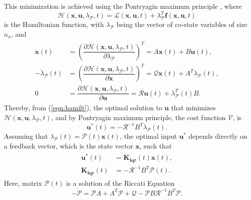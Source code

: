 This minimization is achieved using the Pontryagin maximum principle \cite{Murray2009}, where
\begin{equation}
\mathcal{H}(\mathbf{x},\mathbf{u},\lambda_\mathcal{P},t) = \mathcal{L}(\mathbf{x},\mathbf{u},t) + \lambda_\mathcal{P}^{T}\mathbf{f}(\mathbf{x}, \mathbf{u}, t)
\end{equation}
is the Hamiltonian function, with $\lambda_\mathcal{P}$ being the vector of co-state variables of size $\mathit{n_x}$, and
\begin{align}
\label{eqn:hamilt}
\begin{split}
\dot{\mathbf{x}}(t) & = \left(\dfrac{\partial \mathcal{H}(\mathbf{x},\mathbf{u},\lambda_\mathcal{P},t)}{\partial \lambda_\mathcal{P}}\right)^{T} = A\mathbf{x}(t)+B\mathbf{u}(t),\\[5px]
-\dot{\lambda}_{\mathcal{P}}(t) & = \left(\dfrac{\partial \mathcal{H}(\mathbf{x},\mathbf{u},\lambda_\mathcal{P},t)}{\partial \mathbf{x}}\right)^{T} = \mathcal{Q}\mathbf{x}(t) + A^{T}\lambda_{\mathcal{P}}(t),\\[5px]
0 & = \dfrac{\partial \mathcal{H}(\mathbf{x},\mathbf{u},\lambda_\mathcal{P},t)}{\partial \mathbf{u}} = \mathcal{R}\mathbf{u}(t) + \lambda_\mathcal{P}^{T}(t)B.
\end{split}
\end{align}
Thereby, from (\ref{eqn:hamilt}), the optimal solution to $\mathbf{u}$ that minimizes $\mathcal{H}(\mathbf{x},\mathbf{u},\lambda_\mathcal{P},t)$, and by Pontryagin maximum principle, the cost function $\mathcal{V}$, is
\begin{equation}
\mathbf{u}^{*}(t) = -\mathcal{R}^{-1}B^{T}\lambda_\mathcal{P}(t).
\end{equation}
Assuming that $\lambda_\mathcal{P}(t) = \mathcal{P}(t)\mathbf{x}(t)$, the optimal input $\mathbf{u}^{*}$ depends directly on a feedback vector, which is the state vector $\mathbf{x}$, such that
\begin{align}
\label{eqn:optimalu}
\begin{split}
\mathbf{u}^{*}(t) & = \mathbf{K_{lqr}}(t)\mathbf{x}(t),\\[5px]
\mathbf{K_{lqr}}(t) & = -\mathcal{R}^{-1}B^{T}\mathcal{P}(t).
\end{split}
\end{align}
Here, matrix $\mathcal{P}(t)$ is a solution of the Riccati Equation \cite{Moore1989}
	\begin{equation}
	-\dot{\mathcal{P}} = \mathcal{P}A + A^{T}\mathcal{P} + \mathcal{Q} - \mathcal{P}B\mathcal{R}^{-1}B^{T}\mathcal{P}.
	\end{equation}
